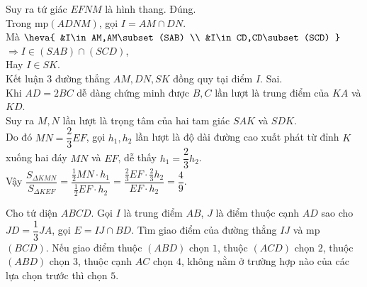 \begin{ex}
{\begin{itemchoice}
			Suy ra tứ giác  $EFNM$ là hình thang.
			\itemch  Đúng.\\
			Trong mp$(ADNM)$, gọi $I=AM  \cap DN$.\\
			Mà $\heva{ 
			&I\in AM,AM\subset (SAB)  \\
			&I\in  CD,CD\subset (SCD) }$ $\Rightarrow I\in (SAB)\cap (SCD)$,\\
			Hay $I \in S  K$.\\
			 Kết luận 3 đường thẳng $AM, DN, SK$ đồng quy tại điểm $I$.
			\itemch Sai.\\ 
			Khi $AD=2BC$ dễ dàng chứng minh được $B, C$ lần lượt là trung điểm của $KA$  và $KD$.\\
			Suy ra $M, N$ lần lượt là trọng tâm của hai tam giác  $SAK$ và $SDK$.\\
			Do đó $MN=\dfrac{2}{3}{EF}$,  gọi $h_1, h_2$ lần lượt là độ dài đường cao xuất phát từ đỉnh $K$ xuống hai đáy $MN$ và $EF$, dễ thấy $h_1=\dfrac{2}{3} h_2$.\\
			Vậy $\dfrac{S_{\Delta K M N}}{S_{\Delta K E F}}=\dfrac{\tfrac{1}{2} MN  \cdot h_1}{\frac{1}{2} EF \cdot h_2}=\dfrac{\tfrac{2}{3} EF \cdot \tfrac{2}{3} h_2}{EF \cdot h_2}=\dfrac{4}{9}$.
		\end{itemchoice}
	 }
\end{ex}



\begin{ex}%
	Cho tứ diện $ABCD$. Gọi $I$ là trung điểm $AB$, $J$ là điểm thuộc cạnh $AD$ sao cho $JD=\dfrac{1}{3}JA$, gọi $E=IJ\cap BD$. Tìm giao điểm của đường thẳng $IJ$ và mp $(BCD)$. Nếu giao điểm thuộc $(ABD)$ chọn $1$, thuộc $(ACD)$ chọn $2$, thuộc $(ABD)$ chọn $3$, thuộc cạnh $AC$ chọn $4$, không nằm ở trường hợp nào của các lựa  chọn trước thì chọn $5$.
\end{ex}

